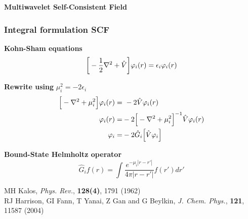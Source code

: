 \begin{frame}
    \centering
    \textbf{\Large{Multiwavelet Self-Consistent Field}}
\end{frame}

\begin{frame}
    \frametitle{Integral formulation SCF}
    \centering
    \textbf{Kohn-Sham equations}
    \begin{equation}
	\nonumber
	\bigg[-\frac{1}{2}\nabla^2 + \hat{V}\bigg]\varphi_i(r) = \epsilon_i \varphi_i(r)
    \end{equation}

    \vspace{5mm}

    \textbf{Rewrite using} $\mu_i^2 = -2\epsilon_i$
    \begin{align}
	\nonumber
	\Big[-\nabla^2 + \mu_i^2\Big]\orbital_i(r) =&\ -2\hat{V}\orbital_i(r)\\
	\nonumber
	\orbital_i(r) =&-2\Big[-\nabla^2 + \mu_i^2\Big]^{-1}\hat{V}\orbital_i(r)\\
	\nonumber
	\orbital_i =&-2\hat{G}_i\Big[\hat{V}\orbital_i\Big]
    \end{align}

    \vspace{5mm}

    \textbf{Bound-State Helmholtz operator}
    \begin{equation}
	\nonumber
	\hat{G}_if(r) = \int \frac{e^{-\mu_i |r-r'|}}{4\pi|r-r'|}f(r')dr'
    \end{equation}

    \vspace{5mm}

    \centering
    \tiny
    MH Kalos,
    {\it Phys. Rev.}, 
    \textbf{128(4)},
    1791 (1962)\\
    RJ Harrison, GI Fann, T Yanai, Z Gan and G Beylkin,
    {\it J. Chem. Phys.}, 
    \textbf{121},
    11587 (2004)
\end{frame}


